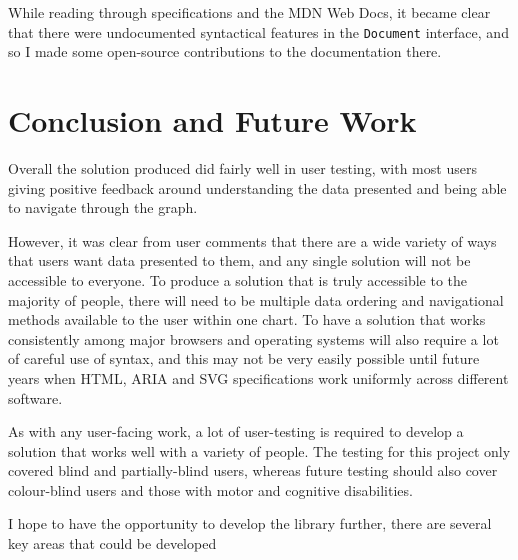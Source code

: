 \documentclass[ %
                    author={Aleena Baig},
                supervisor={Dr Simon Lock},
                    degree={BSc},
                     title={On Making Web Accessible Graphs},
                  subtitle={},
                      year={2019} ]{dissertation}
\begin{document}
While reading through specifications and the MDN Web Docs, it became clear that there were undocumented syntactical features in the \texttt{Document} interface, and so I made some open-source contributions to the documentation there.

\chapter{Conclusion and Future Work}

Overall the solution produced did fairly well in user testing, with most users giving positive feedback around understanding the data presented and being able to navigate through the graph.

However, it was clear from user comments that there are a wide variety of ways that users want data presented to them, and any single solution will not be accessible to everyone. To produce a solution that is truly accessible to the majority of people, there will need to be multiple data ordering and navigational methods available to the user within one chart. To have a solution that works consistently among major browsers and operating systems will also require a lot of careful use of syntax, and this may not be very easily possible until future years when HTML, ARIA and SVG specifications work uniformly across different software.

As with any user-facing work, a lot of user-testing is required to develop a solution that works well with a variety of people. The testing for this project only covered blind and partially-blind users, whereas future testing should also cover colour-blind users and those with motor and cognitive disabilities.

I hope to have the opportunity to develop the library further, there are several key areas that could be developed
\end{document}
